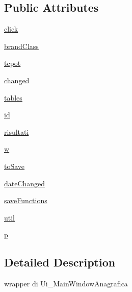 \subsection*{Public Attributes}
\begin{DoxyCompactItemize}
\item 
\hyperlink{classmmasgis_1_1anagrafica_1_1MainWindowAnagrafica_a0eaddc35ac57b17cf88f7d682794921d}{click}
\item 
\hyperlink{classmmasgis_1_1anagrafica_1_1MainWindowAnagrafica_afca39a8513fb64572a4122dc851bb5ea}{brandClass}
\item 
\hyperlink{classmmasgis_1_1anagrafica_1_1MainWindowAnagrafica_acd6984e3ddf6663bd7814daafa474305}{tcpot}
\item 
\hyperlink{classmmasgis_1_1anagrafica_1_1MainWindowAnagrafica_ab537132a59e3cd9be91adbd50e3ccb85}{changed}
\item 
\hyperlink{classmmasgis_1_1anagrafica_1_1MainWindowAnagrafica_a68c19cf1692b300b2bc45737d43eee72}{tables}
\item 
\hyperlink{classmmasgis_1_1anagrafica_1_1MainWindowAnagrafica_a10503182de46a0e72acb2d1b18522603}{id}
\item 
\hyperlink{classmmasgis_1_1anagrafica_1_1MainWindowAnagrafica_a698ac35c3c9a79b476929e62eba6b7b2}{risultati}
\item 
\hyperlink{classmmasgis_1_1anagrafica_1_1MainWindowAnagrafica_a1bc4ff8390a93a2cb0b73e1e1d4b5452}{w}
\item 
\hyperlink{classmmasgis_1_1anagrafica_1_1MainWindowAnagrafica_aa14b8c3d3afc5373c6af2708e65350a8}{toSave}
\item 
\hyperlink{classmmasgis_1_1anagrafica_1_1MainWindowAnagrafica_a5a41df4eef9aa6ba447245a491666069}{dateChanged}
\item 
\hyperlink{classmmasgis_1_1anagrafica_1_1MainWindowAnagrafica_a222bb271aca0fa26db07b9d5e492f8b1}{saveFunctions}
\item 
\hyperlink{classmmasgis_1_1anagrafica_1_1MainWindowAnagrafica_abed3b6867a84cc0bd7eddbb6c6f8128a}{util}
\item 
\hyperlink{classmmasgis_1_1anagrafica_1_1MainWindowAnagrafica_ab1bbee17d7720da9981ed2a9763bb80c}{p}
\end{DoxyCompactItemize}


\subsection{Detailed Description}
\begin{DoxyVerb}
wrapper di Ui_MainWindowAnagrafica
\end{DoxyVerb}
 


